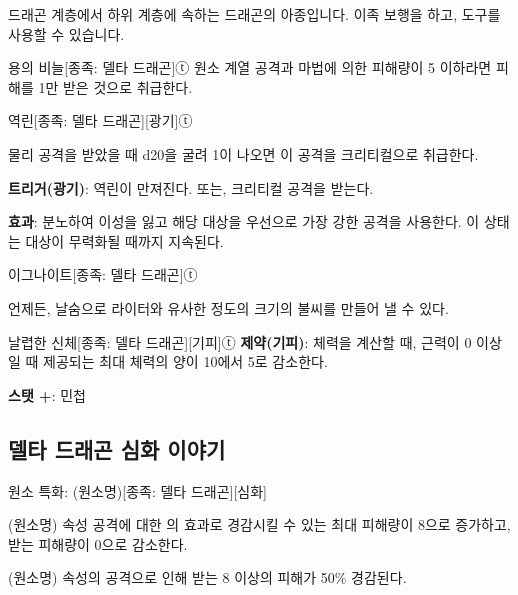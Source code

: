 \documentclass{report}
\begin{document}
	드래곤 계층에서 하위 계층에 속하는 드래곤의 아종입니다. 이족 보행을 하고, 도구를 사용할 수 있습니다.
	
	\begin{story}{용의 비늘}{[종족: 델타 드래곤]ⓣ}
		원소 계열 공격과 마법에 의한 피해량이 5 이하라면 피해를 1만 받은 것으로 취급한다.
		
	\end{story}
	
	\begin{story}{역린}{[종족: 델타 드래곤][광기]ⓣ}
		
		물리 공격을 받았을 때 d20을 굴려 1이 나오면 이 공격을 크리티컬으로 취급한다.
		
		\textbf{트리거(광기)}: 역린이 만져진다. 또는, 크리티컬 공격을 받는다.
		
		\textbf{효과}: 분노하여 이성을 잃고 해당 대상을 우선으로 가장 강한 공격을 사용한다. 이 상태는 대상이 무력화될 때까지 지속된다.
		
	\end{story}
	
	\begin{story}{이그나이트}{[종족: 델타 드래곤]ⓣ}
		
		언제든, 날숨으로 라이터와 유사한 정도의 크기의 불씨를 만들어 낼 수 있다.
		
	\end{story}
	
	\begin{story}{날렵한 신체}{[종족: 델타 드래곤][기피]ⓣ}
		\textbf{제약(기피)}: 체력을 계산할 때, 근력이 0 이상일 때 제공되는 최대 체력의 양이 10에서 5로 감소한다.
		
		\textbf{스탯 +}: 민첩
		
	\end{story}
	
	\subsection{델타 드래곤 심화 이야기}
	
	\begin{story}{원소 특화: (원소명)}{[종족: 델타 드래곤][심화]}
		
		(원소명) 속성 공격에 대한 의 효과로 경감시킬 수 있는 최대 피해량이 8으로 증가하고, 받는 피해량이 0으로 감소한다.
		
		(원소명) 속성의 공격으로 인해 받는 8 이상의 피해가 50\% 경감된다.
		
	\end{story}
\end{document}
